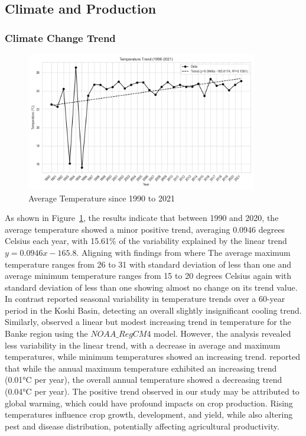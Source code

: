 \subsection{Climate and Production}

\subsubsection{Climate Change Trend}
\begin{figure}[H]
    \centering
    \caption{Average Temperature since 1990 to 2021} 
    \label{fig:trend_avg_temp}
    \includegraphics[width=0.9\textwidth]{images/trend_avg_temp.png}
\end{figure}

As shown in Figure~\ref{fig:trend_avg_temp}, the results indicate that between 1990 and 2020, the average temperature showed a minor positive trend, averaging 0.0946 degrees Celsius each year, with 15.61\% of the variability explained by the linear trend \( y = 0.0946x -165.8 \). Aligning with findings from \citet{regmiCROPYIELDRESPONSE2019} where  The average maximum temperature ranges from 26 to 31 with standard deviation of less than one and average minimum temperature ranges from 15 to 20 degrees Celsius again with standard deviation of less than one showing almost no change on its trend value. In contrast  \citet{puriSpatialTemporalVariations2024} reported seasonal variability in temperature trends over a 60-year period in the Koshi Basin, detecting an overall slightly insignificant cooling trend. Similarly, \citet{risalImpactClimateChange2022} observed a linear but modest increasing trend in temperature for the Banke region using the $NOAA\_RegCM4$ model. However, the analysis revealed less variability in the linear trend, with a decrease in average and maximum temperatures, while minimum temperatures showed an increasing trend. \citet{dawadiImpactClimateChange2022} reported that while the annual maximum temperature exhibited an increasing trend (0.01°C per year), the overall annual temperature showed a decreasing trend (0.04°C per year).
The positive trend observed in our study may be attributed to global warming, which could have profound impacts on crop production. Rising temperatures influence crop growth, development, and yield, while also altering pest and disease distribution, potentially affecting agricultural productivity.

